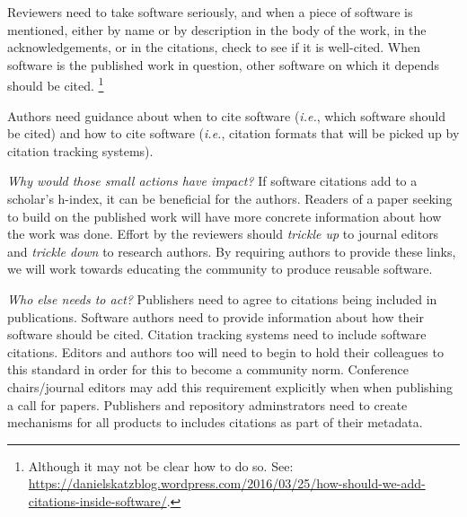 \documentclass[a4paper,UKenglish]{dagman}
\newcommand{\ie}{\emph{i.e.},\xspace}
\begin{document}
Reviewers need to take software seriously, and when a piece of software is mentioned, either by name or by description in the body of the work, in the acknowledgements, or in the citations, check to see if it is well-cited.  When software is the published work in question, other software on which it depends should be cited.%
\footnote{Although it may not be clear how to do so. See:\\ \url{https://danielskatzblog.wordpress.com/2016/03/25/how-should-we-add-citations-inside-software/}.}

Authors need guidance about when to cite software (\ie which software should be cited) and how to cite software (\ie citation formats that will be picked up by citation tracking systems). 

\emph{Why would those small actions have impact?}
If software citations add to a scholar's h-index, it can be beneficial for the authors. Readers of a paper seeking to build on the published work will have more concrete information about how the work was done. 
Effort by the reviewers should \emph{trickle up} to journal editors and \emph{trickle down} to research authors.
By requiring authors to provide these links, we will work towards educating the community to produce reusable software.

\emph{Who else needs to act?} Publishers need to agree to citations being included in publications. Software authors need to provide information about how their software should be cited. Citation tracking systems need to include software citations. 
Editors and authors too will need to begin to hold their colleagues to this standard in order for this to become a community norm.
Conference chairs/journal editors may add this requirement explicitly when when publishing a call for papers. Publishers and repository adminstrators
need to create mechanisms for all products to includes citations as part of their metadata.




\end{document}
